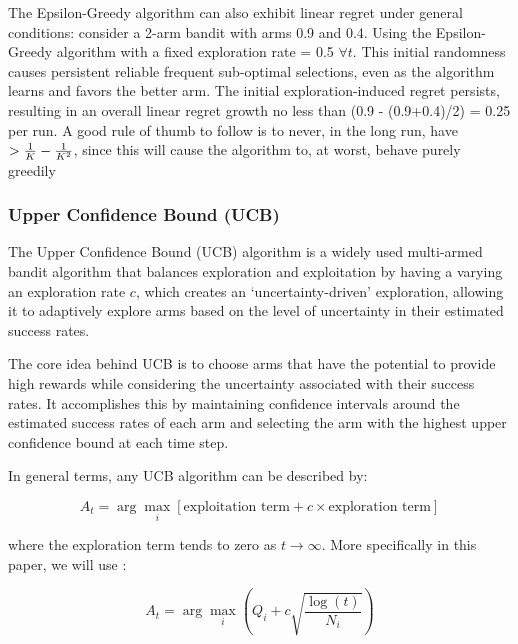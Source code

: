The Epsilon-Greedy algorithm can also exhibit linear regret under general conditions: consider a 2-arm bandit with arms 0.9 and 0.4. Using the Epsilon-Greedy algorithm with a fixed exploration rate \epsilonFunction = 0.5 $\forall t$. This initial randomness causes persistent reliable frequent sub-optimal selections, even as the algorithm learns and favors the better arm. The initial exploration-induced regret persists, resulting in an overall linear regret growth no less than (0.9 - (0.9+0.4)/2) = 0.25 per run. A good rule of thumb to follow is to never, in the long run, have \epsilonFunction $> \frac{1}{K} - \frac{1}{K^2}$, since this will cause the algorithm to, at worst, behave purely greedily


\subsubsection{Upper Confidence Bound (UCB)}
\label{sec:UCB}


The Upper Confidence Bound (UCB) algorithm is a widely used multi-armed bandit algorithm that balances exploration and exploitation by having a varying an exploration rate $c$, which creates an ‘uncertainty-driven’ exploration, allowing it to adaptively explore arms based on the level of uncertainty in their estimated success rates. 

The core idea behind UCB is to choose arms that have the potential to provide high rewards while considering the uncertainty associated with their success rates. It accomplishes this by maintaining confidence intervals around the estimated success rates of each arm and selecting the arm with the highest upper confidence bound at each time step.

In general terms, any UCB algorithm can be described by:

$$
A_t = \arg\max_i \left[ \text{exploitation term} + c \times \text{exploration term} \right]
$$

where the exploration term tends to zero as $t \rightarrow \infty$. More specifically in this paper, we will use\cite{Roberts_2021} :

$$
A_t = \arg\max_i \left( Q_i + c \sqrt{\frac{\log(t)}{N_i}} \right)
$$


